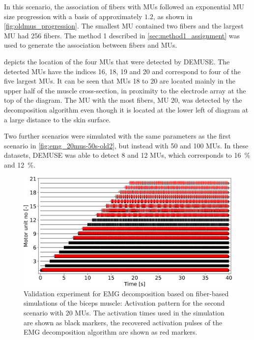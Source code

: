 In this scenario, the association of fibers with MUs followed an exponential MU size progression with a basis of approximately $1.2$, as shown in \cref{fig:oldmus_progression}. The smallest MU contained two fibers and the largest MU had 256 fibers. The method 1 described in \cref{sec:method1_assignment} was used to generate the association between fibers and MUs.

 depicts the location of the four MUs that were detected by DEMUSE. The detected MUs have the indices 16, 18, 19 and 20 and correspond to four of the five largest MUs. It can be seen that MUs 18 to 20 are located mainly in the upper half of the muscle cross-section, in proximity to the electrode array at the top of the diagram.
The MU with the most fibers, MU 20, was detected by the decomposition algorithm even though it is located at the lower left of diagram at a large distance to the skin surface.

Two further scenarios were simulated with the same parameters as the first scenario in \cref{fig:emg_20mus-50s-old2}, but instead with 50 and 100 MUs. In these datasets, DEMUSE was able to detect 8 and 12 MUs, which corresponds to \SI{16}{\percent} and \SI{12}{\percent}. 

\begin{figure}
  \centering%
  \includegraphics[width=\textwidth]{images/results/application/emg_20mus-40s_new3.png}%
  \caption{Validation experiment for EMG decomposition based on fiber-based simulations of the biceps  muscle: Activation pattern for the second scenario with 20 MUs. The activation times used in the simulation are shown as black markers, the recovered activation pulses of the EMG decomposition algorithm are shown as red markers.}%
  \label{fig:emg_20mus-40s_new}%
\end{figure}

